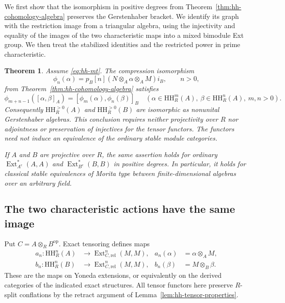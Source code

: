 \documentclass[12pt,a4paper,english,reqno]{amsart}
\numberwithin{equation}{section}
\theoremstyle{plain}
\newtheorem{theorem}{Theorem}[section]
\theoremstyle{definition}
\begin{document}
We first show that the isomorphism in positive degrees from
Theorem~\ref{thm:hh-cohomology-algebra} preserves the Gerstenhaber
bracket. We identify its graph with the restriction image from a
triangular algebra, using the injectivity and equality of the
images of the two characteristic maps into a mixed bimodule Ext
group. We then treat the stabilized identities and the restricted
power in prime characteristic.

\begin{theorem}
\label{thm:relative-gerstenhaber}
Assume \eqref{eq:hh-mt}.  The compression isomorphism
\[
 \phi_n(\alpha)=p_B[n]
       (N\otimes_A\alpha\otimes_A M)i_B,
 \qquad n>0,
\]
from Theorem~\ref{thm:hh-cohomology-algebra} satisfies
\[
 \phi_{m+n-1}([\alpha,\beta]_A)
   =[\phi_m(\alpha),\phi_n(\beta)]_B
 \quad
 (\alpha\in\mathrm{HH}^m_R(A),\ 
  \beta\in\mathrm{HH}^n_R(A),\ m,n>0).
\]
Consequently $\mathrm{HH}^{>0}_R(A)$ and
$\mathrm{HH}^{>0}_R(B)$ are isomorphic as nonunital Gerstenhaber
algebras.  This conclusion requires neither projectivity over $R$
nor adjointness or preservation of injectives for the tensor functors.
The functors need not induce an equivalence of the ordinary stable
module categories.

If $A$ and $B$ are projective over $R$, the same assertion holds for
ordinary $\operatorname{Ext}_{A^e}^*(A,A)$ and
$\operatorname{Ext}_{B^e}^*(B,B)$ in positive degrees.  In particular,
it holds for classical stable equivalences of Morita type between
finite-dimensional algebras over an arbitrary field.
\end{theorem}

\subsection{The two characteristic actions have the same image}

Put $C=A\otimes_R B^{\mathrm{op}}$.  Exact tensoring defines maps
\begin{align*}
 a_n:\mathrm{HH}^n_R(A)&\longrightarrow
          \operatorname{Ext}_{C,\mathrm{rel}}^n(M,M),
 &a_n(\alpha)&=\alpha\otimes_A M,\\
 b_n:\mathrm{HH}^n_R(B)&\longrightarrow
          \operatorname{Ext}_{C,\mathrm{rel}}^n(M,M),
 &b_n(\beta)&=M\otimes_B\beta.
\end{align*}
These are the maps on Yoneda extensions, or equivalently on the
derived categories of the indicated exact structures.
All tensor functors here preserve $R$-split conflations by the retract
argument of Lemma~\ref{lem:hh-tensor-properties}.
\end{document}
